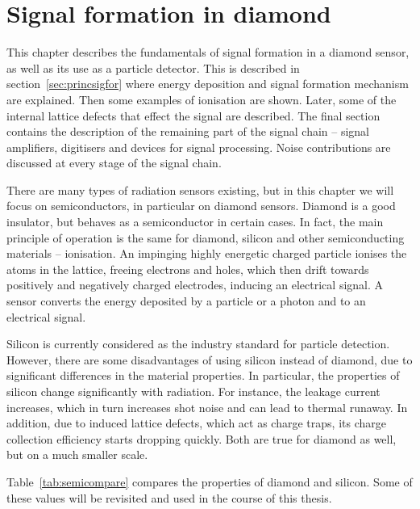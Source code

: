 \documentclass[twoside,12pt]{packages/mytustyle}  %
\begin{document}
\baselineskip=15pt
\newcommand{\ga}{\greektext a\latintext}
\newcommand{\gmu}{\greektext m\latintext}

\chapter{Signal formation in diamond}

This chapter describes the fundamentals of signal formation in a diamond sensor, as well as its use as a particle detector. This is described in section~\ref{sec:princsigfor} where energy deposition and signal formation mechanism are explained. Then some examples of ionisation are shown. Later, some of the internal lattice defects that effect the signal are described. The final section contains the description of the remaining part of the signal chain -- signal amplifiers, digitisers and devices for signal processing. Noise contributions are discussed at every stage of the signal chain.

There are many types of radiation sensors existing, but in this chapter we will focus on semiconductors, in particular on diamond sensors. Diamond is a good insulator, but behaves as a semiconductor in certain cases.  In fact, the main principle of operation is the same for diamond, silicon and other semiconducting materials -- ionisation.  An impinging highly energetic charged particle ionises the atoms in the lattice, freeing electrons and holes, which then drift towards positively and negatively charged electrodes, inducing an electrical signal. A sensor converts the energy deposited by a particle or a photon and to an electrical signal.

Silicon is currently considered as the industry standard for particle detection. However, there are some disadvantages of using silicon instead of diamond, due to significant differences in the material properties. In particular, the properties of silicon change significantly with radiation. For instance, the leakage current increases, which in turn increases shot noise and can lead to thermal runaway. In addition, due to induced lattice defects, which act as charge traps, its charge collection efficiency starts dropping quickly. Both are true for diamond as well, but on a much smaller scale.

Table~\ref{tab:semicompare} compares the properties of diamond and silicon. Some of these values will be revisited and used in the course of this thesis.
\end{document}
